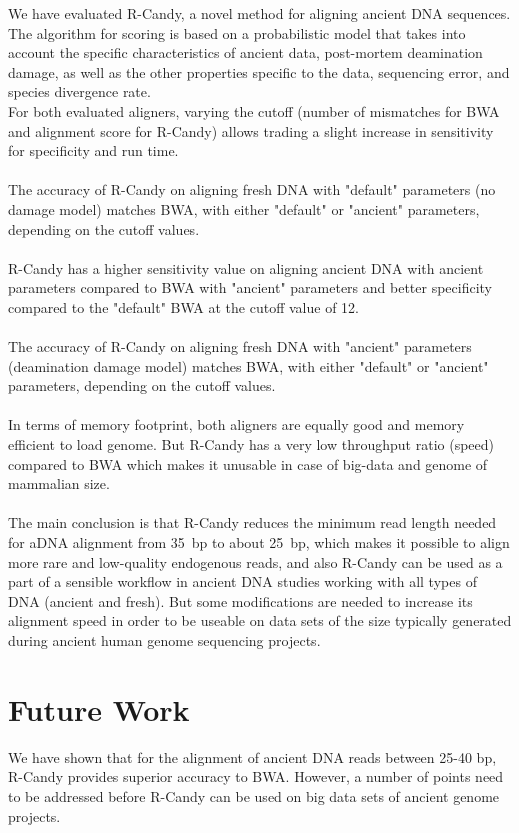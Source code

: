 \documentclass[11pt,a4paper]{report}
\begin{document}
We have evaluated R-Candy, a novel method for aligning ancient DNA sequences.
The algorithm for scoring is based on a probabilistic model that takes into account 
the specific characteristics of ancient data, post-mortem deamination damage, as 
well as the other properties specific to the data, sequencing error, and species
divergence rate. 
\\
For both evaluated aligners, varying the cutoff (number of mismatches for BWA 
and alignment score for R-Candy) allows trading a slight increase in sensitivity 
for specificity and run time.
\\\\
The accuracy of R-Candy on aligning fresh DNA with "default" parameters (no damage model) 
matches BWA, with either "default" or "ancient" parameters, depending  on the cutoff values.
\\\\
R-Candy has a higher sensitivity value on aligning ancient DNA with ancient parameters
compared to BWA with "ancient" parameters and better specificity compared to the 
"default" BWA at the cutoff value of 12.
\\\\
The accuracy of R-Candy on aligning fresh DNA with "ancient" parameters (deamination damage model) 
matches BWA, with either "default" or "ancient" parameters, depending  on the cutoff values.
\\\\
In terms of memory footprint, both aligners are equally good and memory efficient
to load genome. But R-Candy has a very low throughput ratio (speed) compared to 
BWA which makes it unusable in case of big-data and genome of mammalian size. 
\\\\
The main conclusion is that R-Candy reduces the minimum read length needed
for aDNA alignment from 35~bp to about 25~bp, which makes it possible to
align more rare and low-quality endogenous reads, and also R-Candy can be 
used as a part of a sensible workflow in ancient DNA studies
working with all types of DNA (ancient and fresh).
But some modifications are needed to increase its alignment speed 
in order to be useable on data sets of the
size typically generated during ancient human genome sequencing
projects. 



 

\section{Future Work} \label{Future Work}
We have shown that for the alignment of ancient DNA reads between 25-40 
bp, R-Candy provides superior accuracy to BWA.  
However, a number of points need to be addressed before R-Candy can be used 
on big data sets of ancient genome projects. 
\end{document}
